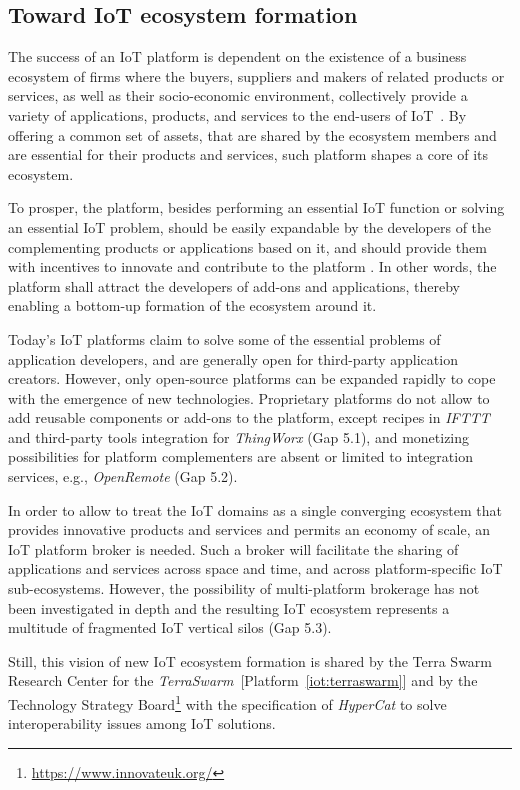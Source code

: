 \documentclass[preprint,10pt,5p]{elsarticle}
\newcommand{\citeiot}[1]{[Platform~\ref{#1}]}
\begin{document}
\subsection{Toward IoT ecosystem formation}
\label{sec:gap_ecosystem}

The success of an IoT platform is dependent on the existence of a business
ecosystem of firms where the buyers, suppliers and makers of related products or
services, as well as their socio-economic environment, collectively provide a 
variety of applications, products, and services to the end-users of IoT~\cite{Mazhelis2012}. 
By offering a common set of assets, that are shared by the ecosystem members and
are essential for their products and services, such platform shapes a core of
its ecosystem. 

To prosper, the platform, besides performing an essential IoT function or
solving an essential IoT problem, should be easily expandable by the developers
of the complementing products or applications based on it, and should provide
them with incentives to innovate and contribute to the platform
\cite{Gawer2008}. In other words, the platform shall attract the developers of
add-ons and applications, thereby enabling a bottom-up formation of the ecosystem around it.

Today's IoT platforms claim to solve some of the essential problems of
application developers, and are generally open for third-party application
creators. However, only open-source platforms can be expanded rapidly to cope
with the emergence of new technologies. Proprietary platforms do not allow to
add reusable components or add-ons  to the platform, except recipes in 
\emph{IFTTT} and  third-party tools integration for 
\emph{ThingWorx} (Gap 5.1), and monetizing possibilities for platform complementers 
are absent or limited to integration services, e.g., \emph{OpenRemote} (Gap 5.2).

In order to allow to treat the IoT domains as a single converging
ecosystem that provides innovative products and services and permits
an economy of scale, an IoT platform broker is needed. 
Such a broker will facilitate the sharing of applications and services
across space and time, and across platform-specific IoT sub-ecosystems.
However, the possibility of multi-platform brokerage has not been
investigated in depth and the resulting IoT ecosystem represents a
multitude of fragmented IoT vertical silos (Gap 5.3).

Still, this vision of new IoT ecosystem formation is shared by the
Terra Swarm Research Center for the
\emph{TerraSwarm}~\citeiot{iot:terraswarm} and by the Technology Strategy
Board\footnote{\url{https://www.innovateuk.org/}} 
with the specification of \emph{HyperCat} to solve interoperability issues 
among IoT solutions.
\end{document}
